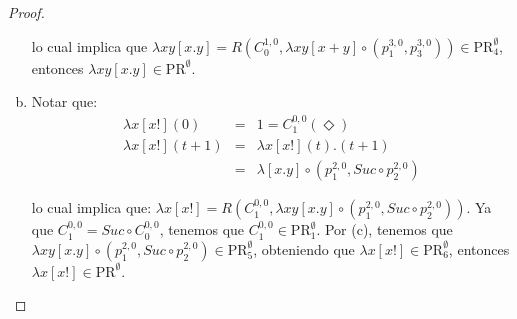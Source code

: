 \begin{proof}
\begin{enumerate}[a)]
        \PN lo cual implica que $\lambda xy \left[x.y\right] = R(C_{0}^{1,0}, \lambda xy \left[x+y\right] \circ
        (p_{1}^{3,0}, p_{3}^{3,0})) \in \mathrm{PR}_{4}^{\emptyset}$, entonces $\lambda xy \left[x.y\right] \in
        \mathrm{PR}^{\emptyset}$.

      \item Notar que:
        \begin{eqnarray*}
          \lambda x \left[x!\right](0) &=& 1 = C_{1}^{0,0}(\Diamond) \\
          \lambda x \left[x!\right](t+1) &=& \lambda x \left[x!\right](t).(t+1) \\
          &=& \lambda \left[x.y\right] \circ (p_{1}^{2,0}, Suc \circ p_{2}^{2,0})
        \end{eqnarray*}

        \PN lo cual implica que: $\lambda x \left[x!\right] = R(C_{1}^{0, 0}, \lambda xy \left[x.y\right] \circ
        (p_{1}^{2,0}, Suc \circ p_{2}^{2,0}))$. Ya que $C_{1}^{0,0} = Suc \circ C_{0}^{0,0}$, tenemos que $C_{1}^{0,0}
        \in \mathrm{PR}_{1}^{\emptyset}$. Por (c), tenemos que $\lambda xy \left[x.y\right] \circ (p_{1}^{2,0}, Suc
        \circ p_{2}^{2,0}) \in \mathrm{PR}_{5}^{\emptyset}$, obteniendo que $\lambda x \left[x!\right] \in
        \mathrm{PR}_{6}^{\emptyset}$, entonces $\lambda x \left[x!\right] \in \mathrm{PR}^{\emptyset}$.
    \end{enumerate}
  \end{proof}

